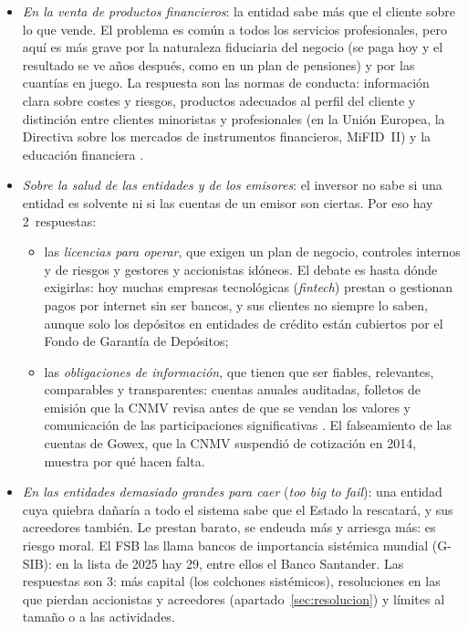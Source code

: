 \documentclass[11pt]{article}
\begin{document}
\begin{itemize}
\begin{itemize}
  \item \emph{En la venta de productos financieros}: la entidad sabe más que el cliente sobre lo que vende. El problema es común a todos los servicios profesionales, pero aquí es más grave por la naturaleza fiduciaria del negocio (se paga hoy y el resultado se ve años después, como en un plan de pensiones) y por las cuantías en juego\nocite{Llewellyn1999}. La respuesta son las normas de conducta: información clara sobre costes y riesgos, productos adecuados al perfil del cliente y distinción entre clientes minoristas y profesionales (en la Unión Europea, la Directiva sobre los mercados de instrumentos financieros, MiFID~II) y la educación financiera\nocite{UE2014MiFID2} .
  \item \emph{Sobre la salud de las entidades y de los emisores}: el inversor no sabe si una entidad es solvente ni si las cuentas de un emisor son ciertas. Por eso hay 2~respuestas:
    \begin{itemize}
    \item las \emph{licencias para operar}, que exigen un plan de negocio, controles internos y de riesgos y gestores y accionistas idóneos. El debate es hasta dónde exigirlas: hoy muchas empresas tecnológicas (\emph{fintech}) prestan o gestionan pagos por internet sin ser bancos, y sus clientes no siempre lo saben, aunque solo los depósitos en entidades de crédito están cubiertos por el Fondo de Garantía de Depósitos;
    \item las \emph{obligaciones de información}, que tienen que ser fiables, relevantes, comparables y transparentes: cuentas anuales auditadas, folletos de emisión que la CNMV revisa antes de que se vendan los valores y comunicación de las participaciones significativas . El falseamiento de las cuentas de Gowex, que la CNMV suspendió de cotización en 2014, muestra por qué hacen falta.
    \end{itemize}
  \item \emph{En las entidades demasiado grandes para caer} (\emph{too big to fail}): una entidad cuya quiebra dañaría a todo el sistema sabe que el Estado la rescatará, y sus acreedores también. Le prestan barato, se endeuda más y arriesga más: es riesgo moral. El FSB las llama bancos de importancia sistémica mundial (G-SIB): en la lista de 2025 hay 29, entre ellos el Banco Santander\nocite{FSB2025GSIB}. Las respuestas son 3: más capital (los colchones sistémicos), resoluciones en las que pierdan accionistas y acreedores (apartado~\ref{sec:resolucion}) y límites al tamaño o a las actividades.

\end{itemize}
\end{itemize}
\end{document}

